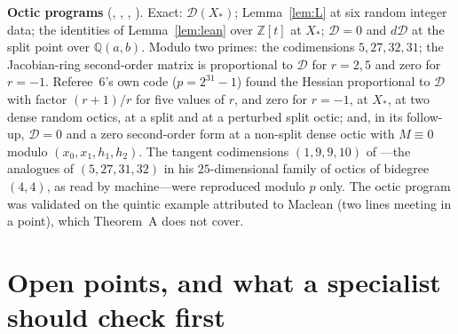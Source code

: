 \documentclass[11pt]{article}
\numberwithin{equation}{section}
\theoremstyle{remark}
\newcommand{\QQ}{\mathbb{Q}}
\newcommand{\cD}{\mathcal{D}}
\newcommand{\run}[1]{\medskip\noindent\textbf{#1}}
\begin{document}
\run{Octic programs} (, , ,
). Exact: $\cD(X_*)$; Lemma~\ref{lem:L} at six random integer data; the identities of
Lemma~\ref{lem:lean} over $\mathbb Z[t]$ at $X_*$; $\cD=0$ and $d\cD$ at the split point over $\QQ(a,b)$. Modulo
two primes: the codimensions $5,27,32,31$; the Jacobian-ring second-order matrix is proportional to $\cD$ for
$r=2,5$ and zero for $r=-1$. Referee~6's own code ($p=2^{31}-1$) found the Hessian proportional to $\cD$ with
factor $(r+1)/r$ for five values of $r$, and zero for $r=-1$, at $X_*$, at two dense random octics, at a split
and at a perturbed split octic; and, in its follow-up, $\cD=0$ and a zero second-order form at a non-split dense
octic with $M\equiv0$ modulo $(x_0,x_1,h_1,h_2)$. The tangent codimensions $(1,9,9,10)$ of
\cite[eq.~(8)]{Mo26}---the analogues of $(5,27,31,32)$ in his $25$-dimensional family of octics of bidegree
$(4,4)$, as read by machine---were reproduced modulo $p$ only. The octic program was validated on the quintic
example attributed to Maclean (two lines meeting in a point), which Theorem~A does not cover.

\section{Open points, and what a specialist should check first}\label{sec:open}
\end{document}
